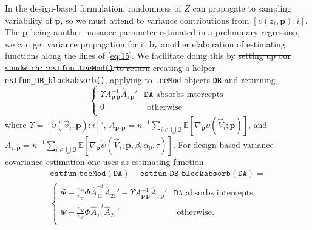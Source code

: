 \documentclass{article}
\newcommand{\absorbInterceptsEF}{\upsilon}
\newcommand{\AbsorbInterceptsEF}{\Upsilon}
\begin{document}
In the design-based formulation, randomness of $Z$ can propagate to
sampling variability of $\hat{\mathbf{p}}$,  so we must attend to
variance contributions from $[\absorbInterceptsEF(z_{i}, \mathbf{p}): i]$.
The $\mathbf{p}$ being another nuisance parameter estimated in a
preliminary regression, we can get variance propagation for it by
another elaboration of estimating functions along the lines of
\eqref{eq:15}. We facilitate doing
this by \st{setting up our
\texttt{sandwich::estfun.teeMod()} to return} creating a
helper \texttt{estfun\_DB\_blockabsorb()}, applying to
\texttt{teeMod} objects \texttt{DB} and returning
\begin{equation*}
\begin{cases}
  \AbsorbInterceptsEF{}
  A_{\mathbf{p}\,\mathbf{p}}^{-1}\hat{A}_{\tau\,\mathbf{p}}' &
  \mathtt{DA} \text{ absorbs intercepts}\\
0 & \text{ otherwise}\\
\end{cases}
\end{equation*}
where
$\AbsorbInterceptsEF= [\absorbInterceptsEF(\vec{v}_{i}; \mathbf{p}): i]'$,
$A_{\mathbf{p}, \mathbf{p}} = n^{-1}\sum_{i\in \bigcup
  \mathcal{Q}}\mathbb{E} [\nabla_{\mathbf{p}}\absorbInterceptsEF(\vec{V}_{i};
\mathbf{p})]$, and $A_{\tau, \mathbf{p}} = n^{-1} \sum_{i\in \bigcup
  \mathcal{Q}}\mathbb{E}[\nabla_{\mathbf{p}}\acute{\psi}(\vec{V}_{i};
\mathbf{p}, \beta, \alpha_{0}, \tau)]$.  For design-based variance-covariance
estimation one uses as estimating function
\begin{multline*}\label{eq:25}
  \mathtt{estfun.teeMod(DA)} -
  \mathtt{estfun\_DB\_blockabsorb(DA)} =\\
\begin{cases}
\acute{\Psi} -
  \frac{n_{\mathcal{Q}}}{n_{\mathcal{C}}}\Phi
  \hat{A}_{11}^{-t}\hat{A}_{21}'  - \AbsorbInterceptsEF{}
  A_{\mathbf{p}\,\mathbf{p}}^{-1}\hat{A}_{\tau\,\mathbf{p}}' & \mathtt{DA} \text{ absorbs intercepts}\\
 \Psi -
  \frac{n_{\mathcal{Q}}}{n_{\mathcal{C}}}\Phi
  \hat{A}_{11}^{-t}\hat{A}_{21}'
 & \text{ otherwise}.\\
\end{cases}
\end{multline*}
\end{document}

